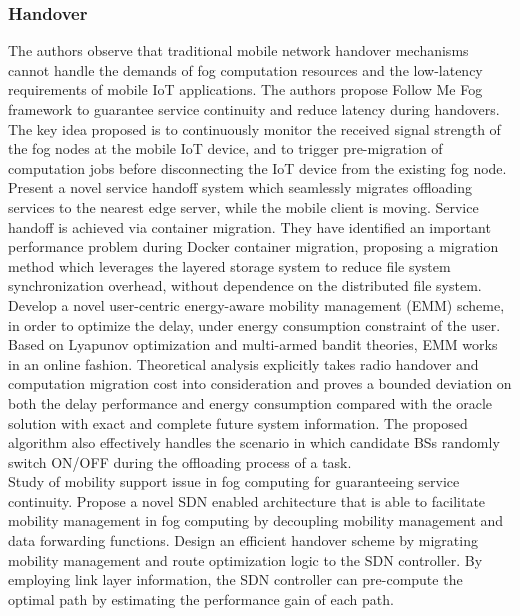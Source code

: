 \subsubsection{Handover}

\cite{bao2017follow}
The authors observe that traditional mobile network handover mechanisms cannot handle the demands of fog computation resources and the low-latency requirements of mobile IoT applications. The authors propose Follow Me Fog framework to guarantee service continuity and reduce latency during handovers. The key idea proposed is to continuously monitor the received signal strength of the fog nodes at the mobile IoT device, and to trigger pre-migration of computation jobs before disconnecting the IoT device from the existing fog node.\\

\cite{ma2017efficient}
Present a novel service handoff system which seamlessly migrates offloading services to the nearest edge server, while the mobile client is moving. Service handoff is achieved via container migration. They have identified an important performance problem during Docker container migration, proposing a migration method which leverages the layered storage system to reduce file system synchronization overhead, without dependence on the distributed file system.\\

\cite{sun2017emm}
Develop a novel user-centric energy-aware mobility management (EMM) scheme, in order to optimize the delay, under energy consumption constraint of the user. Based on Lyapunov optimization and multi-armed bandit theories, EMM works in an online fashion. Theoretical analysis explicitly takes radio handover and computation migration cost into consideration and proves a bounded deviation on both the delay performance and energy consumption compared with the oracle solution with exact and complete future system information. The proposed algorithm also effectively handles the scenario in which candidate BSs randomly switch ON/OFF during the offloading process of a task.\\

\cite{bi2018mobility}
Study of mobility support issue in fog computing for guaranteeing service continuity. Propose a novel SDN enabled architecture that is able to facilitate mobility management in fog computing by decoupling mobility management and data forwarding functions. Design an efficient handover scheme by migrating mobility management and route optimization logic to the SDN controller. By employing link layer information, the SDN controller can pre-compute the optimal path by estimating the performance gain of each path.\\

